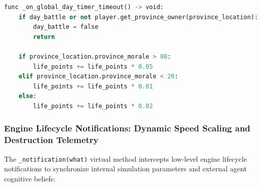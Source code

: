 \begin{lstlisting}[language=python, caption={Daily health regeneration routine based on domestic morale in GDScript.}, label={lst:army_day_timer}]
func _on_global_day_timer_timeout() -> void:
    if day_battle or not player.get_province_owner(province_location):
        day_battle = false
        return
    
    if province_location.province_morale > 80:
        life_points += life_points * 0.05
    elif province_location.province_morale < 20:
        life_points += life_points * 0.01
    else:
        life_points += life_points * 0.02
\end{lstlisting}

\subsubsection{Engine Lifecycle Notifications: Dynamic Speed Scaling and Destruction Telemetry}
The \texttt{\_notification(what)} virtual method intercepts low-level engine lifecycle notifications to synchronize internal simulation parameters and external agent cognitive beliefs:

